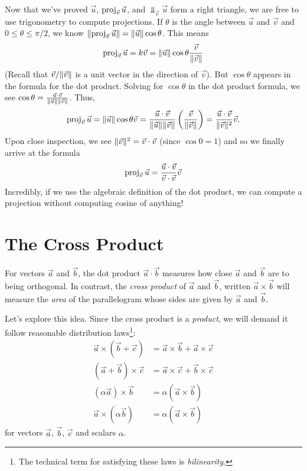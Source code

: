 Now that we've proved $\vec u$, $\operatorname{proj}_{\vec v}\vec u$,
and $\Perp_{\vec v}\vec u$ form a right triangle, we are free to use
trigonometry to compute projections.  If $\theta$ is the angle between $\vec u$
and $\vec v$ and $0\leq \theta\leq \pi/2$, 
we know $\lVert\operatorname{proj}_{\vec v}\vec u\rVert=\lVert\vec u\rVert\cos\theta$.  This means
\[
	\operatorname{proj}_{\vec v}\vec u = k\vec v=\lVert\vec u\rVert\cos\theta\frac{\vec v}{\lVert\vec v\rVert}
\]
(Recall that $\vec v/\lVert\vec v\rVert$ is a unit vector in the direction of $\vec v$).
But $\cos \theta$ appears in the formula for the dot product.  Solving for
$\cos\theta$ in the dot product formula, we see $\cos\theta=\frac{\vec u\cdot\vec v}{\lVert\vec u\rVert\lVert\vec v\rVert}$.
Thus,
\[
	\operatorname{proj}_{\vec v}\vec u = \lVert\vec u\rVert\cos\theta\vec v
	=\frac{\vec u\cdot \vec v}{\lVert\vec u\rVert\lVert\vec v\rVert}\left(\frac{\vec v}{\lVert\vec v\rVert}\right)
	=\frac{\vec u\cdot \vec v}{\lVert\vec v\rVert^2}\vec v.
\]
Upon close inspection, we see $\lVert\vec v\rVert^2=\vec v\cdot \vec v$ (since $\cos 0=1$)
and so we finally arrive at the formula
\[
	\operatorname{proj}_{\vec v}\vec u  
	=\frac{\vec u\cdot \vec v}{\vec v\cdot \vec v}\vec v
\]
Incredibly, if we use the algebraic definition of the dot product, we can
compute a projection without computing cosine of anything!

\begin{exercises}
\end{exercises}

\section{The Cross Product}

For vectors $\vec a$ and $\vec b$, the dot product $\vec a\cdot \vec b$ measures
how close $\vec a$ and $\vec b$ are to being orthogonal.  In contrast,
the \emph{cross product} of $\vec a$ and $\vec b$,
written $\vec a\times \vec b$ will
measure the \emph{area} of the parallelogram whose sides are given by $\vec a$ and
$\vec b$.

Let's explore this idea.  Since the cross product is a \emph{product}, we will
demand it follow reasonable distribution laws\footnote{ The technical term
for satisfying these laws is \emph{bilinearity}.}:
\begin{align*}
	\vec a\times (\vec b+\vec c) &= \vec a\times \vec b+\vec a\times\vec c\\
	(\vec a+\vec b)\times\vec c &= \vec a\times \vec c+\vec b\times \vec c\\
	(\alpha\vec a)\times \vec b &= \alpha(\vec a\times \vec b)\\
	\vec a\times(\alpha \vec b) &= \alpha(\vec a\times \vec b)
\end{align*}
for vectors $\vec a$, $\vec b$, $\vec c$ and scalars $\alpha$.

